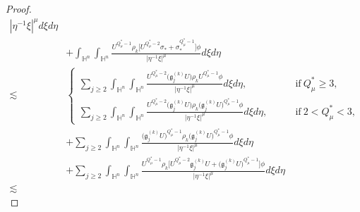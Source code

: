 \documentclass[11pt]{article}
\begin{document}
\begin{proof}
\begin{align*}
{  }
{|\eta^{-1}\xi|^{\mu}}d\xi{d}\eta \\
&+\int_{\mathbb{H}^{n}}\int_{\mathbb{H}^{n}}
  \frac{U^{Q^{\ast}_{\mu}-1} \rho_k      \Big[U^{Q^{\ast}_{\mu}-2}\sigma_* +\sigma_*^{Q^{\ast}_{\mu}-1}\Big] \phi}
{|\eta^{-1}\xi|^{\mu}}d\xi{d}\eta\\
\lesssim &
\begin{cases}
\displaystyle \sum\limits_{j\geq2}\int_{\mathbb{H}^{n}}\int_{\mathbb{H}^{n}}
  \frac{U^{Q^{\ast}_{\mu}-2}\Big(\mathfrak{g}_j^{(k)} U\Big)  \rho_k      U^{Q^{\ast}_{\mu}-1} \phi
  }
{|\eta^{-1}\xi|^{\mu}}d\xi{d}\eta,\qquad &\mathrm{if}~Q_\mu^*\geq3,\\
\displaystyle \sum\limits_{j\geq2}\int_{\mathbb{H}^{n}}\int_{\mathbb{H}^{n}}
  \frac{U^{Q^{\ast}_{\mu}-2}\Big(\mathfrak{g}_j^{(k)} U\Big) \rho_k      \Big(\mathfrak{g}_j^{(k)} U\Big)^{Q^{\ast}_{\mu}-1} \phi
  }
{|\eta^{-1}\xi|^{\mu}}d\xi{d}\eta,\qquad &\mathrm{if}~2< Q_\mu^*<3,
\end{cases}
\\
&+\sum\limits_{j\geq2}\int_{\mathbb{H}^{n}}\int_{\mathbb{H}^{n}}
  \frac{\Big(\mathfrak{g}_j^{(k)} U\Big)^{Q^{\ast}_{\mu}-1} \rho_k      \Big(\mathfrak{g}_j^{(k)} U\Big)^{Q^{\ast}_{\mu}-1} \phi
  }
{|\eta^{-1}\xi|^{\mu}}d\xi{d}\eta
\\
&+\sum\limits_{j\geq2}\int_{\mathbb{H}^{n}}\int_{\mathbb{H}^{n}}
  \frac{U^{Q^{\ast}_{\mu}-1} \rho_k      \bigg[U^{Q^{\ast}_{\mu}-2}\mathfrak{g}_j^{(k)} U +\Big(\mathfrak{g}_j^{(k)} U\Big)^{Q^{\ast}_{\mu}-1}\bigg] \phi}
{|\eta^{-1}\xi|^{\mu}}d\xi{d}\eta\\
\lesssim &

\end{align*}
\end{proof}
\end{document}
